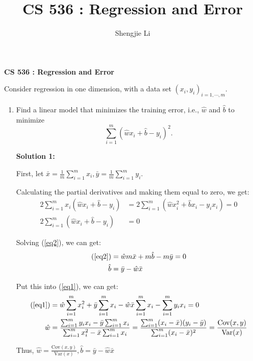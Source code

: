 \documentclass[letter, 12pt]{article}
\author{Shengjie Li}
\title{CS 536 : Regression and Error}
\begin{document}
    \centerline{\textbf{CS 536 : Regression and Error}}
    \par{Consider regression in one dimension, with a data set $ {(x_i , y_i )} _{i=1,\cdots,m} . $}
    \begin{enumerate}
    	\item{
    		Find a linear model that minimizes the training error, i.e., $ \hat{w} $ and $ \hat{b} $ to minimize
    		\[ \sum_{i=1}^{m}( \hat{w}x_i + \hat{b} - y_i )^2 . \]
    	}
    	\par{\textbf{Solution 1:}}
    	\par{First, let $ \bar{x} = \frac{1}{m} \sum_{i=1}^{m} x_i, \bar{y} = \frac{1}{m} \sum_{i=1}^{m} y_i $.}
    	\par{Calculating the partial derivatives and making them equal to zero, we get:}
    	\begin{align}
    		2 \sum_{i=1}^{m} x_i(\hat{w}x_i + \hat{b} - y_i) &= 2 \sum_{i=1}^{m} (\hat{w}x_i^2 + \hat{b}x_i - y_ix_i) = 0 \label{eq1}\\
    		2 \sum_{i=1}^{m} (\hat{w}x_i + \hat{b} - y_i) &= 0 \label{eq2}
    	\end{align}
    	\par{Solving (\ref{eq2}), we can get:}
    	\begin{align*}
	    	(\ref{eq2}) &= \hat{w} m \bar{x}  + m \hat{b} -m \bar{y} = 0 \\
	    	\hat{b} &= \bar{y} - \hat{w} \bar{x}
    	\end{align*}
    	\par{Put this into (\ref{eq1}), we can get:}
    	\begin{align*}
	    	(\ref{eq1}) &= \hat{w} \sum_{i=1}^{m} x_i^2 + \bar{y} \sum_{i=1}^{m} x_i - \hat{w} \bar{x} \sum_{i=1}^{m} x_i - \sum_{i=1}^{m} y_i x_i = 0 \\
	    	\hat{w} &= \frac{\sum_{i=1}^{m} y_i x_i - \bar{y} \sum_{i=1}^{m} x_i}{\sum_{i=1}^{m} x_i^2 - \bar{x} \sum_{i=1}^{m} x_i} = \frac{\sum_{i=1}^{m} (x_i - \bar{x})(y_i - \bar{y})}{\sum_{i=1}^{m} (x_i - \bar{x})^2} = \frac{\text{Cov}(x, y)}{\text{Var}(x)}
    	\end{align*}
    	\par{Thus, $ \hat{w} = \frac{\text{Cov}(x, y)}{\text{Var}(x)}, \hat{b} = \bar{y} - \hat{w} \bar{x} $}
    	

\end{enumerate}
\end{document}
